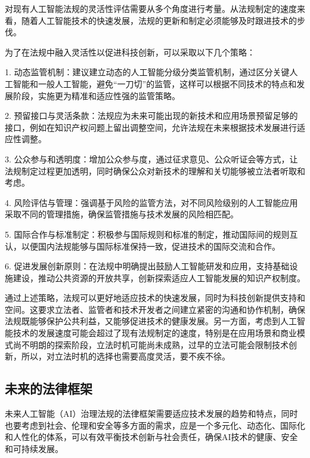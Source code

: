 对现有人工智能法规的灵活性评估需要从多个角度进行考量。从法规制定的速度来看，随着人工智能技术的快速发展，法规的更新和制定必须能够及时跟进技术的步伐。

为了在法规中融入灵活性以促进科技创新，可以采取以下几个策略：

1. 动态监管机制：建议建立动态的人工智能分级分类监管机制，通过区分关键人工智能和一般人工智能，避免“一刀切”的监管，这样可以根据不同技术的特点和发展阶段，实施更为精准和适应性强的监管策略。

2. 预留接口与灵活条款：法规应为未来可能出现的新技术和应用场景预留足够的接口，例如在知识产权问题上留出调整空间，允许法规在未来根据技术发展进行适应性调整。

3. 公众参与和透明度：增加公众参与度，通过征求意见、公众听证会等方式，让法规制定过程更加透明，同时确保公众对新技术的理解和关切能够被立法者听取和考虑。

4. 风险评估与管理：强调基于风险的监管方法，对不同风险级别的人工智能应用采取不同的管理措施，确保监管措施与技术发展的风险相匹配。

5. 国际合作与标准制定：积极参与国际规则和标准的制定，推动国际间的规则互认，以便国内法规能够与国际标准保持一致，促进技术的国际交流和合作。

6. 促进发展创新原则：在法规中明确提出鼓励人工智能研发和应用，支持基础设施建设，推动公共资源的开放共享，创新探索适应人工智能发展的知识产权制度。

通过上述策略，法规可以更好地适应技术的快速发展，同时为科技创新提供支持和空间。这要求立法者、监管者和技术开发者之间建立紧密的沟通和协作机制，确保法规既能够保护公共利益，又能够促进技术的健康发展。另一方面，考虑到人工智能技术的发展速度可能会超过了现有法规制定的速度，特别是在应用场景和商业模式尚不明朗的探索阶段，立法时机可能尚未成熟，过早的立法可能会限制技术创新，所以，对立法时机的选择也需要高度灵活，要不疾不徐。

\subsection{未来的法律框架}
未来人工智能（AI）治理法规的法律框架需要适应技术发展的趋势和特点，同时也要考虑到社会、伦理和安全等多方面的需求，应是一个多元化、动态化、国际化和人性化的体系，可以有效平衡技术创新与社会责任，确保AI技术的健康、安全和可持续发展。

